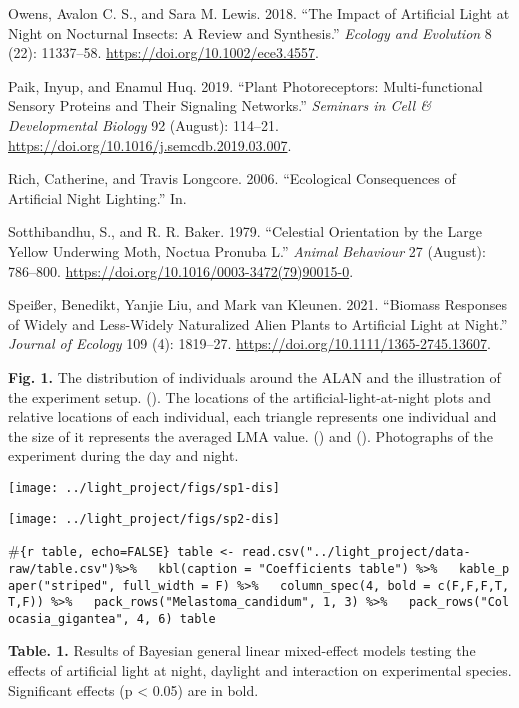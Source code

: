 \documentclass[
]{article}
\newlength{\cslhangindent}
\newlength{\cslentryspacingunit} %
\newenvironment{CSLReferences}[2] %
 {%
  \setlength{\parindent}{0pt}
  \ifodd #1
  \let\oldpar\par
  \def\par{\hangindent=\cslhangindent\oldpar}
  \fi
  \setlength{\parskip}{#2\cslentryspacingunit}
 }%
 {}
\begin{document}
\begin{CSLReferences}{1}{0}
\leavevmode{}%
Owens, Avalon C. S., and Sara M. Lewis. 2018. {``The Impact of
Artificial Light at Night on Nocturnal Insects: {A} Review and
Synthesis.''} \emph{Ecology and Evolution} 8 (22): 11337--58.
\url{https://doi.org/10.1002/ece3.4557}.

\leavevmode{}%
Paik, Inyup, and Enamul Huq. 2019. {``Plant Photoreceptors:
{Multi-functional} Sensory Proteins and Their Signaling Networks.''}
\emph{Seminars in Cell \& Developmental Biology} 92 (August): 114--21.
\url{https://doi.org/10.1016/j.semcdb.2019.03.007}.

\leavevmode{}%
Rich, Catherine, and Travis Longcore. 2006. {``Ecological Consequences
of Artificial Night Lighting.''} In.

\leavevmode{}%
Sotthibandhu, S., and R. R. Baker. 1979. {``Celestial Orientation by the
Large Yellow Underwing Moth, {Noctua} Pronuba {L}.''} \emph{Animal
Behaviour} 27 (August): 786--800.
\url{https://doi.org/10.1016/0003-3472(79)90015-0}.

\leavevmode{}%
Speißer, Benedikt, Yanjie Liu, and Mark van Kleunen. 2021. {``Biomass
Responses of Widely and Less-Widely Naturalized Alien Plants to
Artificial Light at Night.''} \emph{Journal of Ecology} 109 (4):
1819--27. \url{https://doi.org/10.1111/1365-2745.13607}.

\end{CSLReferences}

\newpage

\textbf{Fig. 1.} The distribution of individuals around the ALAN and the
illustration of the experiment setup. (). The locations of the
artificial-light-at-night plots and relative locations of each
individual, each triangle represents one individual and the size of it
represents the averaged LMA value. () and (). Photographs of the
experiment during the day and night.

\texttt{[image: ../light\_project/figs/sp1-dis]}

\texttt{[image: ../light\_project/figs/sp2-dis]}

\newpage

\#\texttt{\{r\ table,\ echo=FALSE\}\ table\ \textless{}-\ read.csv("../light\_project/data-raw/table.csv")\%\textgreater{}\%\ \ \ kbl(caption\ =\ "Coefficients\ table")\ \%\textgreater{}\%\ \ \ kable\_paper("striped",\ full\_width\ =\ F)\ \%\textgreater{}\%\ \ \ column\_spec(4,\ bold\ =\ c(F,F,F,T,T,F))\ \%\textgreater{}\%\ \ \ pack\_rows("Melastoma\_candidum",\ 1,\ 3)\ \%\textgreater{}\%\ \ \ pack\_rows("Colocasia\_gigantea",\ 4,\ 6)\ table}

\textbf{Table. 1.} Results of Bayesian general linear mixed-effect
models testing the effects of artificial light at night, daylight and
interaction on experimental species. Significant effects (p \textless{}
0.05) are in bold.

\newpage
\end{document}
